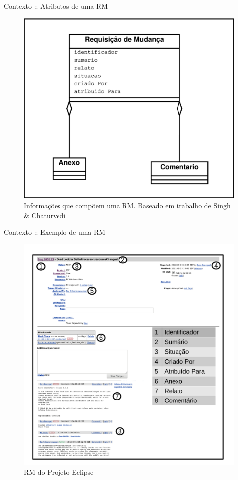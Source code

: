 \documentclass[t,14pt,mathserif]{beamer}
\begin{document}
\begin{frame}{Contexto :: Atributos de uma RM}

    \begin{figure}[htpb]
        \centering
        \includegraphics[width=0.55\linewidth]{../img/diagrama-classe-atributos-requisicao-mudancas.pdf}
        \caption{Informações que compõem uma RM\@. Baseado em trabalho de Singh \&
            Chaturvedi~\cite{singh2011bug}}
\label{fig:diagrama-classe-atributos-requisicao-mudancas}
    \end{figure}

\end{frame}

\begin{frame}{Contexto :: Exemplo de uma RM}

    \begin{figure}[htpb]
        \centering
        \includegraphics[width=0.5\linewidth]{../img/rm-exemplo.pdf}
        \caption{RM do Projeto Eclipse}
\label{fig:rm-exemplo}
    \end{figure}

\end{frame}
\end{document}
